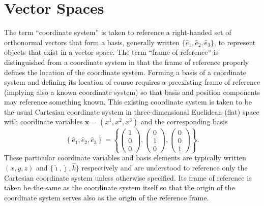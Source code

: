 \documentclass[11pt,dvipsnames]{thesis}
\begin{document}
\section{Vector Spaces}
The term ``coordinate system'' is taken to reference a right-handed set of orthonormal vectors that form a basis, generally written $\{\hat{e}_1, \hat{e}_2, \hat{e}_3\}$, to represent objects that exist in a vector space. The term ``frame of reference'' is distinguished from a coordinate system in that the frame of reference properly defines the location of the coordinate system. Forming a basis of a coordinate system and defining its location of course requires a preexisting frame of reference (implying also a known coordinate system) so that basis and position components may reference something known. This existing coordinate system is taken to be the usual Cartesian coordinate system in three-dimensional Euclidean (flat) space with coordinate variables $\mathbf{x} = (x^1, x^2, x^3)$ and the corresponding basis
\begin{equation}
\left\{\hat{e}_1, \hat{e}_2, \hat{e}_3\right\} = \left\{\begin{pmatrix}1 \\ 0 \\ 0\end{pmatrix}, \begin{pmatrix}0 \\ 1 \\ 0\end{pmatrix}, \begin{pmatrix}0 \\ 0 \\ 1\end{pmatrix}\right\}.
\end{equation}
These particular coordinate variables and basis elements are typically written $(x, y, z)$ and $\{\hat{\imath}, \hat{\jmath}, \hat{k}\}$ respectively and are understood to reference only the Cartesian coordinate system unless otherwise specified. Its frame of reference is taken be the same as the coordinate system itself so that the origin of the coordinate system serves also as the origin of the reference frame.
\end{document}
